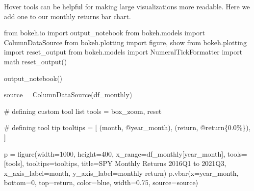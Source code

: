\documentclass[
  letterpaper,
  DIV=11,
  numbers=noendperiod]{scrreprt}
\newenvironment{Shaded}{\begin{snugshade}}{\end{snugshade}}
\newcommand{\CommentTok}[1]{\textcolor[rgb]{0.37,0.37,0.37}{#1}}
\newcommand{\DecValTok}[1]{\textcolor[rgb]{0.68,0.00,0.00}{#1}}
\newcommand{\FloatTok}[1]{\textcolor[rgb]{0.68,0.00,0.00}{#1}}
\newcommand{\ImportTok}[1]{\textcolor[rgb]{0.00,0.46,0.62}{#1}}
\newcommand{\NormalTok}[1]{\textcolor[rgb]{0.00,0.23,0.31}{#1}}
\newcommand{\OperatorTok}[1]{\textcolor[rgb]{0.37,0.37,0.37}{#1}}
\newcommand{\StringTok}[1]{\textcolor[rgb]{0.13,0.47,0.30}{#1}}
\begin{document}
Hover tools can be helpful for making large visualizations more
readable. Here we add one to our monthly returns bar chart.

\begin{Shaded}
\begin{Highlighting}[]
\ImportTok{from}\NormalTok{ bokeh.io }\ImportTok{import}\NormalTok{ output\_notebook}
\ImportTok{from}\NormalTok{ bokeh.models }\ImportTok{import}\NormalTok{ ColumnDataSource}
\ImportTok{from}\NormalTok{ bokeh.plotting }\ImportTok{import}\NormalTok{ figure, show}
\ImportTok{from}\NormalTok{ bokeh.plotting }\ImportTok{import}\NormalTok{ reset\_output}
\ImportTok{from}\NormalTok{ bokeh.models }\ImportTok{import}\NormalTok{ NumeralTickFormatter}
\ImportTok{import}\NormalTok{ math}
\NormalTok{reset\_output()}

\NormalTok{output\_notebook()}

\NormalTok{source }\OperatorTok{=}\NormalTok{ ColumnDataSource(df\_monthly)}

\CommentTok{\# defining custom tool list}
\NormalTok{tools }\OperatorTok{=} \StringTok{\textquotesingle{}box\_zoom, reset\textquotesingle{}}

\CommentTok{\# defining tool tip}
\NormalTok{tooltips }\OperatorTok{=}\NormalTok{ [}
\NormalTok{    (}\StringTok{\textquotesingle{}month\textquotesingle{}}\NormalTok{, }\StringTok{\textquotesingle{}@year\_month\textquotesingle{}}\NormalTok{),}
\NormalTok{    (}\StringTok{\textquotesingle{}return\textquotesingle{}}\NormalTok{, }\StringTok{\textquotesingle{}@return\{0.0\%\}\textquotesingle{}}\NormalTok{),}
\NormalTok{]}

\NormalTok{p }\OperatorTok{=}\NormalTok{ figure(width}\OperatorTok{=}\DecValTok{1000}\NormalTok{, height}\OperatorTok{=}\DecValTok{400}\NormalTok{, x\_range}\OperatorTok{=}\NormalTok{df\_monthly[}\StringTok{\textquotesingle{}year\_month\textquotesingle{}}\NormalTok{], tools}\OperatorTok{=}\NormalTok{[tools], tooltips}\OperatorTok{=}\NormalTok{tooltips,}
\NormalTok{           title}\OperatorTok{=}\StringTok{\textquotesingle{}SPY Monthly Returns 2016Q1 to 2021Q3\textquotesingle{}}\NormalTok{, x\_axis\_label}\OperatorTok{=}\StringTok{\textquotesingle{}month\textquotesingle{}}\NormalTok{, y\_axis\_label}\OperatorTok{=}\StringTok{\textquotesingle{}monthly return\textquotesingle{}}\NormalTok{)}
\NormalTok{p.vbar(x}\OperatorTok{=}\StringTok{\textquotesingle{}year\_month\textquotesingle{}}\NormalTok{, bottom}\OperatorTok{=}\DecValTok{0}\NormalTok{, top}\OperatorTok{=}\StringTok{\textquotesingle{}return\textquotesingle{}}\NormalTok{, color}\OperatorTok{=}\StringTok{\textquotesingle{}blue\textquotesingle{}}\NormalTok{, width}\OperatorTok{=}\FloatTok{0.75}\NormalTok{, source}\OperatorTok{=}\NormalTok{source)}


\end{Highlighting}
\end{Shaded}
\end{document}
